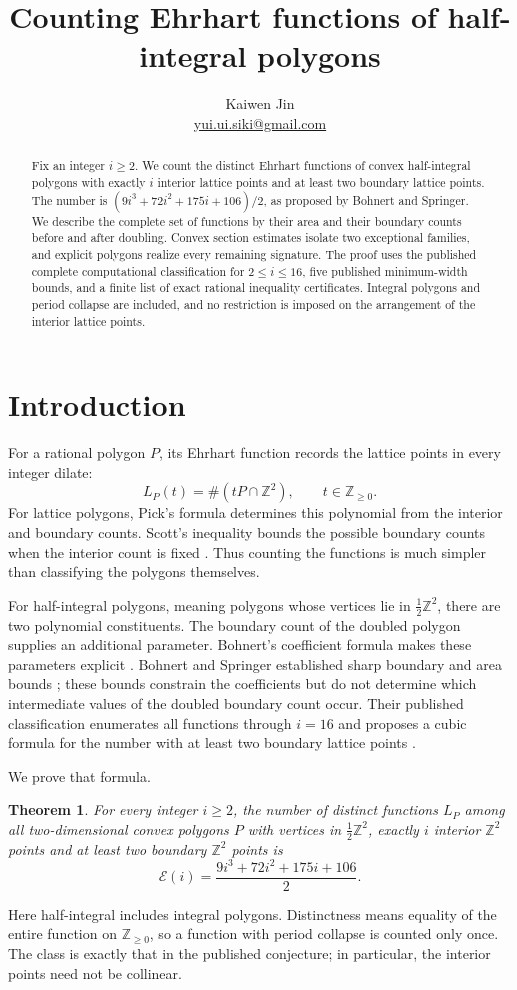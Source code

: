 \documentclass[11pt]{article}
\title{Counting Ehrhart functions of half-integral polygons}
\author{Kaiwen Jin\\\small\href{mailto:yui.ui.siki@gmail.com}{yui.ui.siki@gmail.com}}
\date{}
\newtheorem{theorem}{Theorem}[section]
\newcommand{\Z}{\mathbb Z}
\newcommand{\Ehr}{\mathcal E}
\begin{document}
\maketitle
\begin{abstract}
Fix an integer \(i\ge2\). We count the distinct Ehrhart functions of convex
half-integral polygons with exactly \(i\) interior lattice points and at least
two boundary lattice points. The number is
\((9i^3+72i^2+175i+106)/2\), as proposed by Bohnert and Springer.
We describe the complete set of functions by their area and their boundary
counts before and after doubling. Convex section estimates isolate two
exceptional families, and explicit polygons realize every remaining
signature. The proof uses the published complete computational classification
for \(2\le i\le16\), five published minimum-width bounds, and a finite list of
exact rational inequality certificates. Integral polygons and period collapse
are included, and no restriction is imposed on the arrangement of the
interior lattice points.
\end{abstract}

\section{Introduction}
For a rational polygon \(P\), its Ehrhart function records the lattice points
in every integer dilate:
\[
 L_P(t)=\#(tP\cap\Z^2),\qquad t\in\Z_{\ge0}.
\]
For lattice polygons, Pick's formula determines this polynomial from the
interior and boundary counts. Scott's inequality bounds the possible boundary
counts when the interior count is fixed \cite{Scott}. Thus counting the
functions is much simpler than classifying the polygons themselves.

For half-integral polygons, meaning polygons whose vertices lie in
\(\frac12\Z^2\), there are two polynomial constituents. The boundary count of
the doubled polygon supplies an additional parameter. Bohnert's coefficient
formula makes these parameters explicit \cite[Proposition 2.1]{Collapse}.
Bohnert and Springer established sharp boundary and area bounds
\cite[Theorems 1.1 and 1.4]{Inequalities}; these bounds constrain the
coefficients but do not determine which intermediate values of the doubled
boundary count occur. Their published classification enumerates all functions
through \(i=16\) and proposes a cubic formula for the number with at least
two boundary lattice points \cite[Conjecture 6.8]{Classification}.

We prove that formula.
\begin{theorem}\label{thm:count}
For every integer \(i\ge2\), the number of distinct functions \(L_P\) among
all two-dimensional convex polygons \(P\) with vertices in
\(\frac12\Z^2\), exactly \(i\) interior \(\Z^2\) points and at least two
boundary \(\Z^2\) points is
\[
 \Ehr(i)=\frac{9i^3+72i^2+175i+106}{2}.
\]
\end{theorem}
Here half-integral includes integral polygons. Distinctness means equality
of the entire function on \(\Z_{\ge0}\), so a function with period collapse
is counted only once. The class is exactly that in the published conjecture;
in particular, the interior points need not be collinear.
\end{document}
